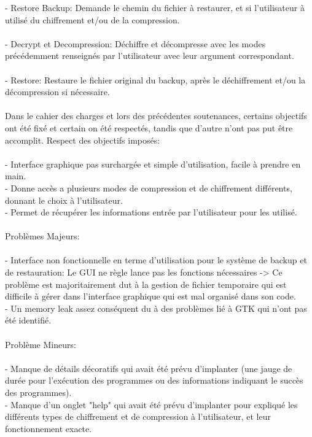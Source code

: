 	- Restore Backup: Demande le chemin du fichier à restaurer, et si l'utilisateur à utilisé du chiffrement et/ou de la compression.\\\\
	- Decrypt et Decompression: Déchiffre et décompresse avec les modes précédemment renseignés par l'utilisateur avec leur argument correspondant. \\\\
	- Restore: Restaure le fichier original du backup, après le déchiffrement et/ou la décompression si nécessaire.\\\\

    Dans le cahier des charges et lors des précédentes soutenances, certains objectifs ont été fixé et certain on été respectés, tandis que d'autre n'ont pas put être accomplit.
\newpage
    Respect des objectifs imposés:\\\\
    - Interface graphique pas surchargée et simple d'utilisation, facile à prendre en main.\\
    - Donne accès a plusieurs modes de compression et de chiffrement différents, donnant le choix à l'utilisateur.\\
    - Permet de récupérer les informations entrée par l'utilisateur pour les utilisé.\\\\
    
    Problèmes Majeurs:\\\\
    - Interface non fonctionnelle en terme d'utilisation pour le système de backup et de restauration: Le GUI ne règle lance pas les fonctions nécessaires -> Ce problème est majoritairement dut à la gestion de fichier temporaire qui est difficile à gérer dans l'interface graphique qui est mal organisé dans son code.\\
    - Un memory leak assez conséquent du à des problèmes lié à GTK qui n'ont pas été identifié.\\\\
    
    Problème Mineurs:\\\\
    - Manque de détails décoratifs qui avait été prévu d'implanter (une jauge de durée pour l'exécution des programmes ou des informations indiquant le succès des programmes).\\
    - Manque d'un onglet "help" qui avait été prévu d'implanter pour expliqué les différents types de chiffrement et de compression à l'utilisateur, et leur fonctionnement exacte.\\
    
